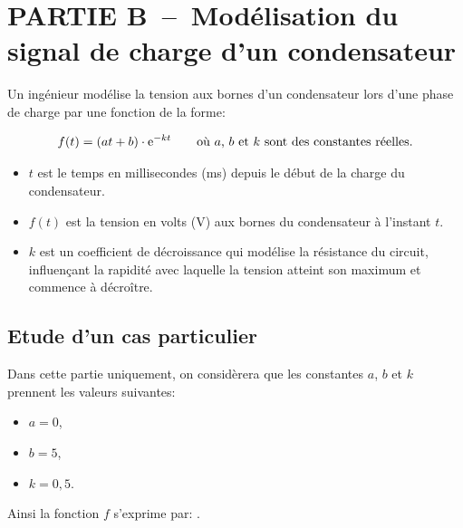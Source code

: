 \bigskip

\section*{PARTIE B~--~Modélisation du signal de charge d'un condensateur}

Un ingénieur modélise la tension aux bornes d'un condensateur lors d'une phase de charge par une fonction de la forme:

\[f(t)=(at+b)\cdot \mathrm{e}^{-kt}\qquad \text{où $a$, $b$ et $k$ sont des constantes réelles.}\]

\begin{itemize}
    \item $t$ est le temps en millisecondes (ms) depuis le début de la charge du condensateur.
    \item $f(t)$ est la tension en volts (V) aux bornes du condensateur à l'instant $t$.
    \item $k$ est un coefficient de décroissance qui modélise la résistance du circuit, influençant la rapidité avec laquelle la tension atteint son maximum et commence à décroître.
\end{itemize}

\subsection*{Etude d'un cas particulier}

    Dans cette partie uniquement, on considèrera que les constantes $a$, $b$ et $k$ prennent les valeurs suivantes:

    \begin{minipage}{0.28\textwidth}
\begin{itemize}
    \item $a=0$,
    \item $b=5$,
    \item $k=0,5$.
\end{itemize}
\end{minipage}\hfill{}
\begin{minipage}{0.68\textwidth}
    Ainsi la fonction $f$ s'exprime par: .

\end{minipage}



